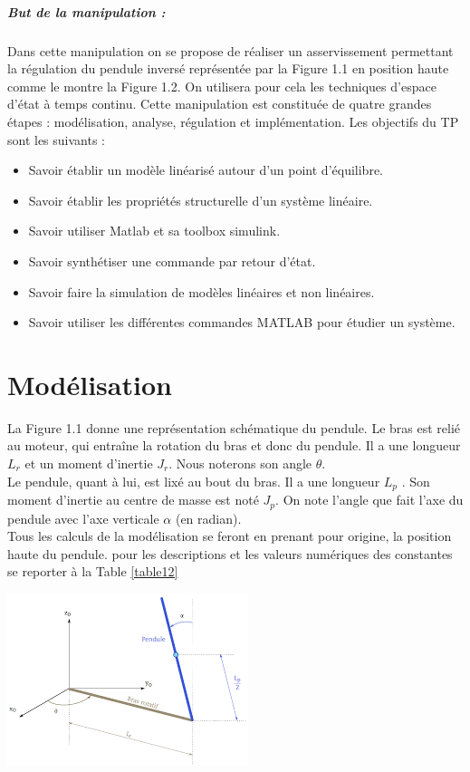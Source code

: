 \documentclass[12pt, a4paper, openany]{report}
\begin{document}
\paragraph{But de la manipulation :}  Dans cette manipulation on se propose de réaliser un asservissement permettant la régulation du pendule inversé représentée par la Figure 1.1 en position haute comme le montre la Figure 1.2. On utilisera pour cela les techniques d'espace d'état à temps continu. Cette manipulation est constituée de quatre grandes étapes : modélisation, analyse, régulation et implémentation. Les objectifs du TP sont les suivants :
\begin{itemize}
\item Savoir établir un modèle linéarisé autour d'un point d'équilibre.
\item Savoir établir les propriétés structurelle d'un système linéaire.
\item Savoir utiliser Matlab et sa toolbox simulink.
\item Savoir synthétiser une commande par retour d'état.
\item Savoir faire la simulation de modèles linéaires et non linéaires.
\item Savoir utiliser les différentes commandes MATLAB pour étudier un système.

\end{itemize}

    
 \chapter{Modélisation}
 
 La Figure 1.1 donne une représentation schématique du pendule. Le bras est relié au moteur, qui entraîne la rotation du bras et donc du pendule. Il a une longueur $L_{r}$ et un moment d'inertie $J_{r}$. Nous noterons son angle $\theta$.\\
 Le pendule, quant à lui, est lixé au bout du bras. Il a une longueur $L_{p}$ . Son moment d'inertie au
centre de masse est noté $J_{p}$. On note l'angle que fait l'axe du pendule avec l'axe verticale $\alpha$ (en radian).\\
 Tous les calculs de la modélisation se feront en prenant pour origine, la position haute du pendule. pour les descriptions et les valeurs numériques des constantes se reporter à la Table \ref{table12}\\
 

\begin{center}
\includegraphics[scale=1]{ShemaPendule.png}
\label{fig2} 
\end{center}
\end{document}
